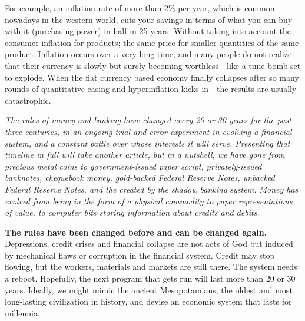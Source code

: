 For example, an inflation rate of more than 2\% per year, which is common nowadays in the western world, cuts your savings in terms of what you can buy with it (purchasing power) in half in 25 years. Without taking into account the consumer inflation for products; the same price for smaller quantities of the same product. Inflation occurs over a very long time, and many people do not realize that their currency is slowly but surely becoming worthless - like a time bomb set to explode. When the fiat currency based economy finally collapses after so many rounds of quantitative easing and hyperinflation kicks in - the results are usually catastrophic\cite{weimarhyperinflation}. \medskip

\medskip

    \begin{tcolorbox}
    [enhanced,
    title=Banking system,
    frame style=
    {left color=orange!85!black,right color=yellow!95!black}]

         \itshape{The rules of money and banking have changed every 20 or 30 years for the past three centuries, in an ongoing trial-and-error experiment in evolving a financial system, and a constant battle over whose interests it will serve. Presenting that timeline in full will take another article, but in a nutshell, we have gone from precious metal coins to government-issued paper script, privately-issued banknotes, chequebook money, gold-backed Federal Reserve Notes, unbacked Federal Reserve Notes, and the  created by the shadow banking system. Money has evolved from being  in the form of a physical commodity to paper representations of value, to computer bits storing information about credits and debits.}
        
        \tcblower
        
        \textbf{The rules have been changed before and can be changed again.} Depressions, credit crises and financial collapse are not acts of God but induced by mechanical flaws or corruption in the financial system. Credit may stop flowing, but the workers, materials and markets are still there. The system needs a reboot. Hopefully, the next program that gets run will last more than 20 or 30 years. Ideally, we might mimic the ancient Mesopotamians, the oldest and most long-lasting civilization in history, and devise an economic system that lasts for millennia.\cite{EllenBrown}

\end{tcolorbox}

